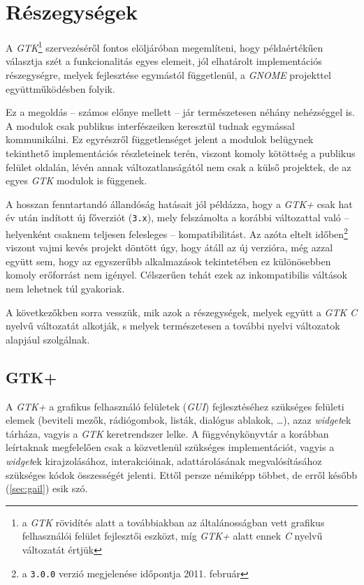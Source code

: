 \section{Részegységek}

A \textit{GTK}\footnote{a \textit{GTK} rövidítés alatt a továbbiakban az általánosságban vett grafikus felhasználói felület fejlesztői eszközt, míg \textit{GTK+} alatt ennek \textit{C} nyelvű változatát értjük} szervezéséről fontos elöljáróban megemlíteni, hogy példaértékűen választja szét a funkcionalitás egyes elemeit, jól elhatárolt implementációs részegységre, melyek fejlesztése egymástól függetlenül, a \textit{GNOME} projekttel együttműködésben folyik.

Ez a megoldás -- számos előnye mellett -- jár természetesen néhány nehézséggel is. A modulok csak publikus interfészeiken keresztül tudnak egymással kommunikálni. Ez egyrészről függetlenséget jelent a modulok belügynek tekinthető implementációs részleteinek terén, viszont komoly kötöttség a publikus felület oldalán, lévén annak változatlanságától nem csak a külső projektek, de az egyes \textit{GTK} modulok is függenek.

A hosszan fenntartandó állandóság hatásait jól példázza, hogy a \textit{GTK+} csak hat év után indított új főverziót (\texttt{3.x}), mely felszámolta a korábbi változattal való -- helyenként csaknem teljesen felesleges -- kompatibilitást. Az azóta eltelt időben\footnote{a \texttt{3.0.0} verzió megjelenése időpontja 2011. február} viszont vajmi kevés projekt döntött úgy, hogy átáll az új verzióra, még azzal együtt sem, hogy az egyszerűbb alkalmazások tekintetében ez különösebben komoly erőforrást nem igényel. Célszerűen tehát ezek az inkompatibilis váltások nem lehetnek túl gyakoriak.

A következőkben sorra vesszük, mik azok a részegységek, melyek együtt a \textit{GTK} \textit{C} nyelvű változatát alkotják, s melyek természetesen a további nyelvi változatok alapjául szolgálnak.

\subsection{GTK+}

A \textit{GTK+} a grafikus felhasználó felületek (\textit{GUI}) fejlesztéséhez szükséges felületi elemek (beviteli mezők, rádiógombok, listák, dialógus ablakok, \dots), azaz \textit{widget}ek tárháza, vagyis a \textit{GTK} keretrendszer lelke. A függvénykönyvtár a korábban leírtaknak megfelelően csak a közvetlenül szükséges implementációt, vagyis a \textit{widget}ek kirajzolásához, interakcióinak, adattárolásának megvalósításához szükséges kódok összességét jelenti. Ettől persze némiképp többet, de erről később (\ref{sec:gail}) esik szó.

